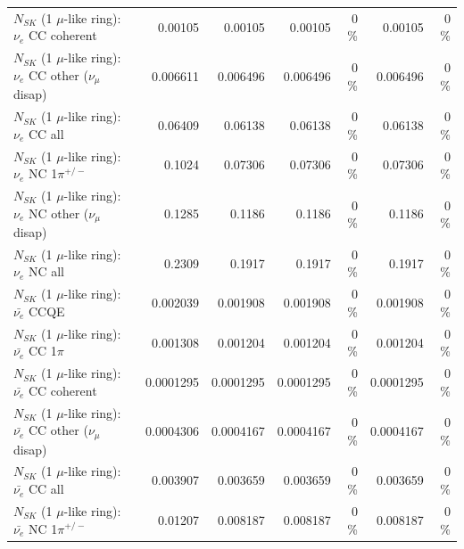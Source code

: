 \begin{table}
\begin{tabular}{| l | r | r | r  r | r  r |}
                               $N_{SK}$ (1 $\mu$-like ring): $\nu_e$ CC coherent &         0.00105 &         0.00105 &         0.00105 &        0 \%  &         0.00105 &        0 \%  \\ 
                $N_{SK}$ (1 $\mu$-like ring): $\nu_e$ CC other ($\nu_\mu$ disap) &        0.006611 &        0.006496 &        0.006496 &        0 \%  &        0.006496 &        0 \%  \\ 
                                  $N_{SK}$ (1 $\mu$-like ring): $\nu_{e}$ CC all &         0.06409 &         0.06138 &         0.06138 &        0 \%  &         0.06138 &        0 \%  \\ 
\hline
                           $N_{SK}$ (1 $\mu$-like ring): $\nu_e$ NC 1$\pi^{+/-}$ &          0.1024 &         0.07306 &         0.07306 &        0 \%  &         0.07306 &        0 \%  \\ 
                $N_{SK}$ (1 $\mu$-like ring): $\nu_e$ NC other ($\nu_\mu$ disap) &          0.1285 &          0.1186 &          0.1186 &        0 \%  &          0.1186 &        0 \%  \\ 
                                  $N_{SK}$ (1 $\mu$-like ring): $\nu_{e}$ NC all &          0.2309 &          0.1917 &          0.1917 &        0 \%  &          0.1917 &        0 \%  \\ 
\hline
\hline
\hline
                                $N_{SK}$ (1 $\mu$-like ring): $\bar{\nu_e}$ CCQE &        0.002039 &        0.001908 &        0.001908 &        0 \%  &        0.001908 &        0 \%  \\ 
                           $N_{SK}$ (1 $\mu$-like ring): $\bar{\nu_e}$ CC 1$\pi$ &        0.001308 &        0.001204 &        0.001204 &        0 \%  &        0.001204 &        0 \%  \\ 
                         $N_{SK}$ (1 $\mu$-like ring): $\bar{\nu_e}$ CC coherent &       0.0001295 &       0.0001295 &       0.0001295 &        0 \%  &       0.0001295 &        0 \%  \\ 
          $N_{SK}$ (1 $\mu$-like ring): $\bar{\nu_e}$ CC other ($\nu_\mu$ disap) &       0.0004306 &       0.0004167 &       0.0004167 &        0 \%  &       0.0004167 &        0 \%  \\ 
                            $N_{SK}$ (1 $\mu$-like ring): $\bar{\nu_{e}}$ CC all &        0.003907 &        0.003659 &        0.003659 &        0 \%  &        0.003659 &        0 \%  \\ 
\hline
                     $N_{SK}$ (1 $\mu$-like ring): $\bar{\nu_e}$ NC 1$\pi^{+/-}$ &         0.01207 &        0.008187 &        0.008187 &        0 \%  &        0.008187 &        0 \%  \\ 

\end{tabular}
\end{table}
